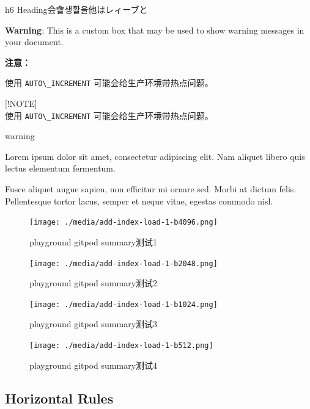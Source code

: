 \documentclass[
  paper=a4,
  ,captions=tableheading
]{scrartcl}
\newcommand{\passthrough}[1]{#1}
\renewenvironment{quote}{\begin{customblockquote}\list{}{\rightmargin=0em\leftmargin=0em}%
\item\relax\color{blockquote-text}\ignorespaces}{\unskip\unskip\endlist\end{customblockquote}}
\begin{document}
h6 Heading会會생활을他はレィーブと

\textbf{Warning}: This is a custom box that may be used to show warning
messages in your document.

\begin{quote}
\textbf{注意：}

使用 \passthrough{\lstinline!AUTO\_INCREMENT!}
可能会给生产环境带热点问题。
\end{quote}

\begin{info-box}

{[}!NOTE{]}\\
使用 \passthrough{\lstinline!AUTO\_INCREMENT!}
可能会给生产环境带热点问题。

\end{info-box}

\begin{quote}
warning
\end{quote}

Lorem ipsum dolor sit amet, consectetur adipiscing elit. Nam aliquet
libero quis lectus elementum fermentum.

Fusce aliquet augue sapien, non efficitur mi ornare sed. Morbi at dictum
felis. Pellentesque tortor lacus, semper et neque vitae, egestas commodo
nisl.

\begin{figure}
\centering
\texttt{[image: ./media/add-index-load-1-b4096.png]}
\caption{playground gitpod summary测试1}
\end{figure}

\begin{figure}
\centering
\texttt{[image: ./media/add-index-load-1-b2048.png]}
\caption{playground gitpod summary测试2}
\end{figure}

\begin{figure}
\centering
\texttt{[image: ./media/add-index-load-1-b1024.png]}
\caption{playground gitpod summary测试3}
\end{figure}

\begin{figure}
\centering
\texttt{[image: ./media/add-index-load-1-b512.png]}
\caption{playground gitpod summary测试4}
\end{figure}

\hypertarget{horizontal-rules}{%
\subsection{Horizontal Rules}\label{horizontal-rules}}
\end{document}
